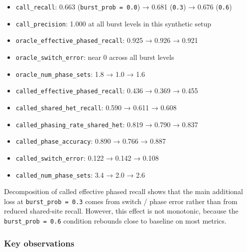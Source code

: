 \documentclass[
]{article}
\providecommand{\tightlist}{%
  \setlength{\itemsep}{0pt}\setlength{\parskip}{0pt}}
\begin{document}
\begin{itemize}
\tightlist
\item
  \texttt{call\_recall}: 0.663 (\texttt{burst\_prob\ =\ 0.0}) → 0.681
  (\texttt{0.3}) → 0.676 (\texttt{0.6})
\item
  \texttt{call\_precision}: 1.000 at all burst levels in this synthetic
  setup
\item
  \texttt{oracle\_effective\_phased\_recall}: 0.925 → 0.926 → 0.921
\item
  \texttt{oracle\_switch\_error}: near 0 across all burst levels
\item
  \texttt{oracle\_num\_phase\_sets}: 1.8 → 1.0 → 1.6
\item
  \texttt{called\_effective\_phased\_recall}: 0.436 → 0.369 → 0.455
\item
  \texttt{called\_shared\_het\_recall}: 0.590 → 0.611 → 0.608
\item
  \texttt{called\_phasing\_rate\_shared\_het}: 0.819 → 0.790 → 0.837
\item
  \texttt{called\_phase\_accuracy}: 0.890 → 0.766 → 0.887
\item
  \texttt{called\_switch\_error}: 0.122 → 0.142 → 0.108
\item
  \texttt{called\_num\_phase\_sets}: 3.4 → 2.0 → 2.6
\end{itemize}

Decomposition of called effective phased recall shows that the main
additional loss at \texttt{burst\_prob\ =\ 0.3} comes from switch /
phase error rather than from reduced shared-site recall. However, this
effect is not monotonic, because the \texttt{burst\_prob\ =\ 0.6}
condition rebounds close to baseline on most metrics.

\subsubsection{Key observations}\label{key-observations-3}
\end{document}
